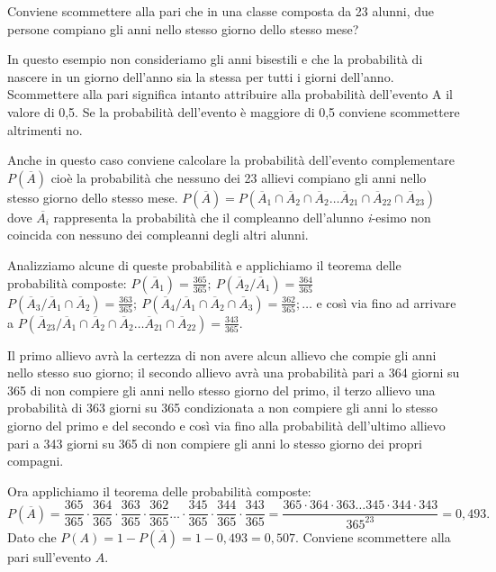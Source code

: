 \begin{esempio}
Conviene scommettere alla pari che in una classe composta da 23 alunni, due 
persone compiano gli anni nello stesso giorno dello stesso mese?

In questo esempio non consideriamo gli anni bisestili e che la probabilità di 
nascere in un giorno dell'anno sia la stessa per tutti i giorni dell'anno. 
Scommettere alla pari significa intanto attribuire alla probabilità 
dell'evento 
A il valore di 0,5. Se la probabilità dell'evento è maggiore di 0,5 conviene 
scommettere altrimenti no.

Anche in questo caso conviene calcolare la probabilità dell'evento 
complementare 
\(P(\overline A)\) cioè la probabilità che nessuno dei 23 allievi compiano gli 
anni nello stesso giorno dello stesso mese. \(P(\overline A)=P(\overline 
A_1\cap 
\overline A_2\cap \overline A_2\ldots \overline A_{21}\cap \overline 
A_{22}\cap 
\overline A_{23})\) dove \(\overline{A_i}\) rappresenta la probabilità che il 
compleanno dell'alunno \emph{i}{}-esimo non coincida con nessuno dei 
compleanni 
degli altri alunni.

Analizziamo alcune di queste probabilità e applichiamo il teorema delle 
probabilità composte: \(P(\overline A_1)=\frac{365}{365};\ P(\overline 
A_2/\overline A_1)=\frac{364}{365}\) \(P(\overline A_3/\overline A_1\cap 
\overline 
A_2)=\frac{363}{365};\ P(\overline A_4/\overline A_1\cap \overline A_2\cap 
\overline A_3)=\frac{362}{365};\ldots \) e così via fino ad arrivare a 
\(P(\overline A_{23}/\overline A_1\cap \overline A_2\cap \overline A_2\ldots 
\overline A_{21}\cap \overline A_{22})=\frac{343}{365}\).

Il primo allievo avrà la certezza di non avere alcun allievo che compie gli 
anni 
nello stesso suo giorno; il secondo allievo avrà una probabilità pari a 364 
giorni su 365 di non compiere gli anni nello stesso giorno del primo, il 
terzo 
allievo una probabilità di 363 giorni su 365 condizionata a non compiere gli 
anni lo stesso giorno del primo e del secondo e così via fino alla 
probabilità 
dell'ultimo allievo pari a 343 giorni su 365 di non compiere gli anni lo 
stesso 
giorno dei propri compagni.

Ora applichiamo il teorema delle probabilità composte: \[ P(\overline 
A)=\frac{365}{365}\cdot \frac{364}{365}\cdot \frac{363}{365}\cdot 
\frac{362}{365}\ldots \cdot \frac{345}{365}\cdot \frac{344}{365}\cdot 
\frac{343}{365}=\frac{365\cdot 364\cdot 363\ldots 345 \cdot 344\cdot 
343}{365^{23}}=0,493. \] Dato che \(P(A)=1-P(\overline A)=1-0,493=0,507\).
\conclusione Conviene scommettere alla pari sull'evento \( A \).
\end{esempio}

